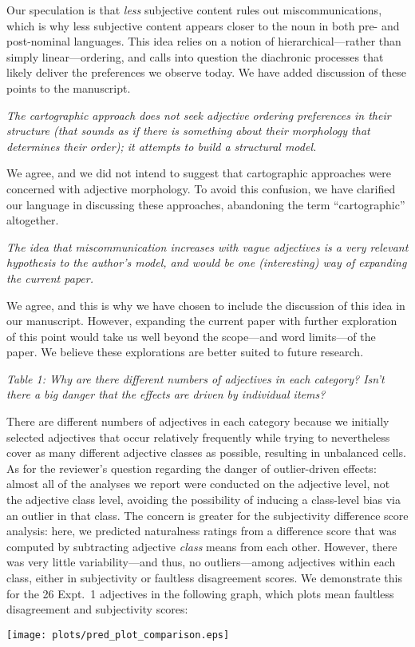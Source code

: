 \documentclass[12pt]{article}
\begin{document}
Our speculation is that \emph{less} subjective content rules out miscommunications, which is why less subjective content appears closer to the noun in both pre- and post-nominal languages. This idea relies on a notion of hierarchical---rather than simply linear---ordering, and calls into question the diachronic processes that likely deliver the preferences we observe today. We have added discussion of these points to the manuscript.

\item \emph{The cartographic approach does not seek adjective ordering preferences in their structure (that sounds as if there is something about their morphology that determines their order); it attempts to build a structural model.}

We agree, and we did not intend to suggest that cartographic approaches were concerned with adjective morphology. To avoid this confusion, we have clarified our language in discussing these approaches, abandoning the term ``cartographic'' altogether.

\item \emph{The idea that miscommunication increases with vague adjectives is a very relevant hypothesis to the author's model, and would be one (interesting) way of expanding the current paper.}

We agree, and this is why we have chosen to include the discussion of this idea in our manuscript. However, expanding the current paper with further exploration of this point would take us well beyond the scope---and word limits---of the paper. We believe these explorations are better suited to future research.

\item \emph{Table 1: Why are there different numbers of adjectives in each category? Isn't there a big danger that the effects are driven by individual items?}

There are different numbers of adjectives in each category because we initially selected adjectives that occur relatively frequently while trying to nevertheless cover as many different adjective classes as possible, resulting in unbalanced cells. As for the reviewer's question regarding the danger of outlier-driven effects: almost all of the analyses we report were conducted on the adjective level, not the adjective class level, avoiding the possibility of inducing a class-level bias via an outlier in that class. The concern is greater for the subjectivity difference score analysis: here, we predicted naturalness ratings from a difference score that was computed by subtracting adjective \emph{class} means from each other. However, there was very little variability---and thus, no outliers---among adjectives within each class, either in subjectivity or faultless disagreement scores. We demonstrate this for the 26 Expt.~1 adjectives in the following graph, which plots mean faultless disagreement and subjectivity scores:
\begin{center}
	\texttt{[image: plots/pred\_plot\_comparison.eps]}
\end{center}
\end{document}

